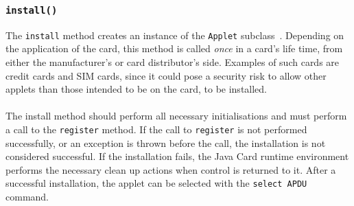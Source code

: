 \subsubsection{\texttt{install()}}\label{subsec:jcinstall}
The \texttt{install} method creates an instance of the \texttt{Applet} subclass~\cite[p. 65]{java_card_spec}. Depending on the application of the card, this method is called \textit{once} in a card's life time, from either the manufacturer's or card distributor's side. Examples of such cards are credit cards and SIM cards, since it could pose a security risk to allow other applets than those intended to be on the card, to be installed.\\\\
The install method should perform all necessary initialisations and must perform a call to the \texttt{register} method. If the call to \texttt{register} is not performed successfully, or an exception is thrown before the call, the installation is not considered successful. If the installation fails, the Java Card runtime environment performs the necessary clean up actions when control is returned to it. After a successful installation, the applet can be selected with the \texttt{select APDU} command.
